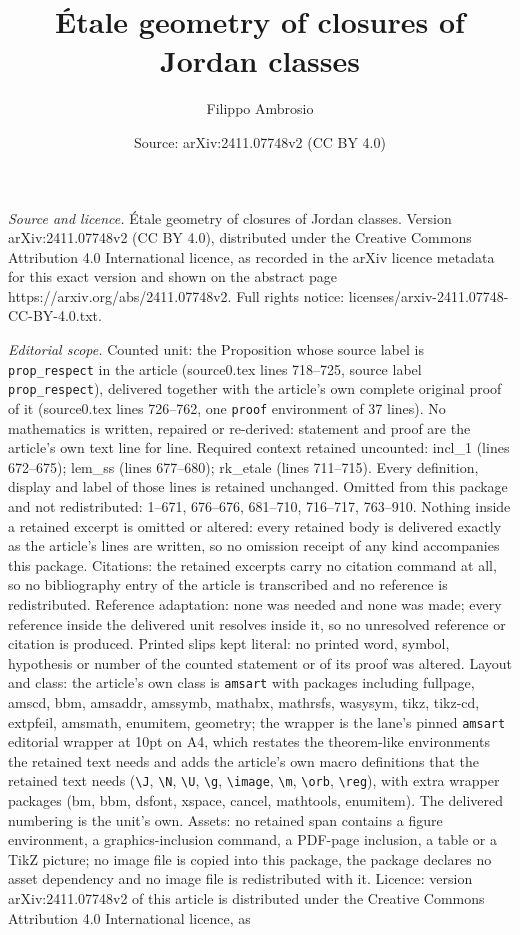\documentclass[10pt,a4paper]{amsart}
\title[\'Etale geometry of closures of Jordan classes]{\'Etale geometry of closures of Jordan classes}
\author{Filippo Ambrosio}
\date{Source: arXiv:2411.07748v2 (CC BY 4.0)}
\begin{document}
\maketitle

\noindent\emph{Source and licence.} \'Etale geometry of closures of Jordan classes. Version arXiv:2411.07748v2 (CC BY 4.0), distributed under the Creative Commons Attribution 4.0 International licence, as recorded in the arXiv licence metadata for this exact version and shown on the abstract page https://arxiv.org/abs/2411.07748v2. Full rights notice: licenses/arxiv-2411.07748-CC-BY-4.0.txt.\par\smallskip

\noindent\textit{Editorial scope.} Counted unit: the Proposition whose source label is \texttt{prop\_respect} in the article (source0.tex lines 718--725, source label \texttt{prop\_respect}), delivered together with the article's own complete original proof of it (source0.tex lines 726--762, one \texttt{proof} environment of 37 lines). No mathematics is written, repaired or re-derived: statement and proof are the article's own text line for line. Required context retained uncounted: incl\_1 (lines 672--675); lem\_ss (lines 677--680); rk\_etale (lines 711--715). Every definition, display and label of those lines is retained unchanged. Omitted from this package and not redistributed: 1--671, 676--676, 681--710, 716--717, 763--910. Nothing inside a retained excerpt is omitted or altered: every retained body is delivered exactly as the article's lines are written, so no omission receipt of any kind accompanies this package. Citations: the retained excerpts carry no citation command at all, so no bibliography entry of the article is transcribed and no reference is redistributed. Reference adaptation: none was needed and none was made; every reference inside the delivered unit resolves inside it, so no unresolved reference or citation is produced. Printed slips kept literal: no printed word, symbol, hypothesis or number of the counted statement or of its proof was altered. Layout and class: the article's own class is \texttt{amsart} with packages including fullpage, amscd, bbm, amsaddr, amssymb, mathabx, mathrsfs, wasysym, tikz, tikz-cd, extpfeil, amsmath, enumitem, geometry; the wrapper is the lane's pinned \texttt{amsart} editorial wrapper at 10pt on A4, which restates the theorem-like environments the retained text needs and adds the article's own macro definitions that the retained text needs (\texttt{\textbackslash J}, \texttt{\textbackslash N}, \texttt{\textbackslash U}, \texttt{\textbackslash g}, \texttt{\textbackslash image}, \texttt{\textbackslash m}, \texttt{\textbackslash orb}, \texttt{\textbackslash reg}), with extra wrapper packages (bm, bbm, dsfont, xspace, cancel, mathtools, enumitem). The delivered numbering is the unit's own. Assets: no retained span contains a figure environment, a graphics-inclusion command, a PDF-page inclusion, a table or a TikZ picture; no image file is copied into this package, the package declares no asset dependency and no image file is redistributed with it. Licence: version arXiv:2411.07748v2 of this article is distributed under the Creative Commons Attribution 4.0 International licence, as 
\end{document}
